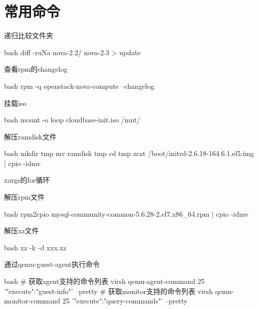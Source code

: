 \section{常用命令}
\begin{outline}[enumerate]
\1 递归比较文件夹
\begin{code-in-enumerate}{bash}
diff -ruNa nova-2.2/ nova-2.3 > update
\end{code-in-enumerate}

\1 查看rpm的changelog
\begin{code-in-enumerate}{bash}
rpm -q openstack-nova-compute --changelog
\end{code-in-enumerate}

\1 挂载iso
\begin{code-in-enumerate}{bash}
mount -o loop cloudbase-init.iso /mnt/
\end{code-in-enumerate}

\1 解压ramdisk文件
\begin{code-in-enumerate}{bash}
mkdir tmp
mv ramdisk tmp
cd tmp
zcat /boot/initrd-2.6.18-164.6.1.el5.img | cpio -idmv
\end{code-in-enumerate}

\1 xargs的for循环

\1 解压rpm文件
\begin{code-in-enumerate}{bash}
rpm2cpio mysql-community-common-5.6.28-2.el7.x86_64.rpm | cpio -idmv
\end{code-in-enumerate}

\1 解压xz文件
\begin{code-in-enumerate}{bash}
xz -k -d xxx.xz
\end{code-in-enumerate}

\1 通过qemu-guest-agent执行命令
\begin{code-in-enumerate}{bash}
# 获取agent支持的命令列表
virsh qemu-agent-command 25 '{"execute":"guest-info"}' --pretty
# 获取monitor支持的命令列表
virsh qemu-monitor-command 25 '{"execute":"query-commands"}' --pretty
\end{code-in-enumerate}


\end{outline}
